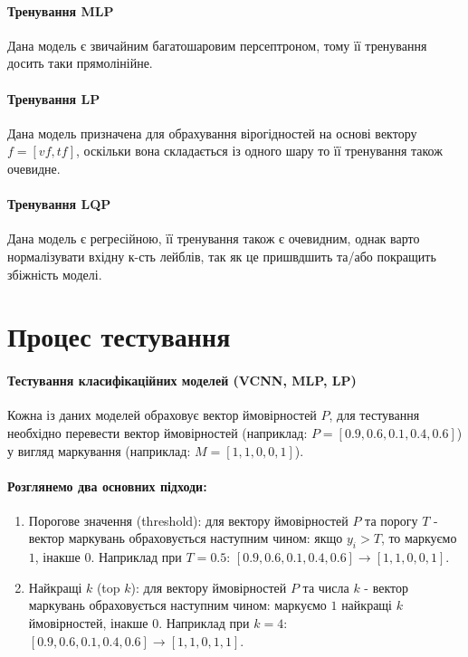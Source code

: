 \documentclass{udstu}
\begin{document}
\paragraph{\textbf{Тренування MLP}\\}

Дана модель є звичайним багатошаровим персептроном, тому її тренування досить таки прямолінійне.


\paragraph{\textbf{Тренування LP}\\}

Дана модель призначена для обрахування вірогідностей на основі вектору $f = [vf, tf]$, оскільки вона
складається із одного шару то її тренування також очевидне.


\paragraph{\textbf{Тренування LQP}\\}

Дана модель є регресійною, її тренування також є очевидним, однак варто нормалізувати
вхідну к-сть лейблів, так як це пришвдшить та/або покращить збіжність моделі.


\section{Процес тестування}

\paragraph{\textbf{Тестування класифікаційних моделей (VCNN, MLP, LP)}\\}

Кожна із даних моделей обраховує вектор ймовірностей $P$,
для тестування необхідно перевести вектор ймовірностей (наприклад: $P = [0.9, 0.6, 0.1, 0.4, 0.6]$)
у вигляд маркування (наприклад: $M = [1,1,0,0,1]$).

\paragraph{Розглянемо два основних підходи:}

\begin{enumerate}[1)]
	\item Порогове значення (threshold):
	для вектору ймовірностей $P$ та порогу $T$ - вектор маркувань обраховується наступним чином:
	якщо $y_i > T$, то маркуємо $1$, інакше $0$.
	Наприклад при $T = 0.5$: $[0.9, 0.6, 0.1, 0.4, 0.6] \to [1,1,0,0,1]$.

	\item Найкращі $k$ (top $k$):
	для вектору ймовірностей $P$ та числа $k$ - вектор маркувань обраховується наступним чином:
	маркуємо $1$ найкращі $k$ ймовірностей, інакше $0$.
	Наприклад при $k = 4$: $[0.9, 0.6, 0.1, 0.4, 0.6] \to [1,1,0,1,1]$.
\end{enumerate}
\end{document}
